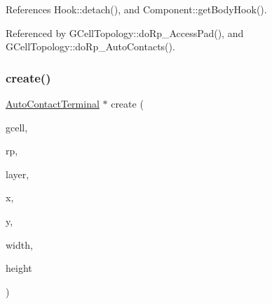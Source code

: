 References Hook\+::detach(), and Component\+::get\+Body\+Hook().



Referenced by G\+Cell\+Topology\+::do\+Rp\+\_\+\+Access\+Pad(), and G\+Cell\+Topology\+::do\+Rp\+\_\+\+Auto\+Contacts().

\mbox{\label{classKatabatic_1_1AutoContactTerminal_a60a625bca2cdfebcdcc7826ab781d1bb}} 
\subsubsection{\texorpdfstring{create()}{create()}\hspace{0.1cm}{\footnotesize\ttfamily [2/2]}}
{\footnotesize\ttfamily \mbox{\hyperlink{classKatabatic_1_1AutoContactTerminal}{Auto\+Contact\+Terminal}} $\ast$ create (\begin{DoxyParamCaption}\item[{\mbox{\hyperlink{classKatabatic_1_1GCell}{G\+Cell}} $\ast$}]{gcell,  }\item[{\textbf{ Component} $\ast$}]{rp,  }\item[{const \textbf{ Layer} $\ast$}]{layer,  }\item[{const \textbf{ Db\+U\+::\+Unit}}]{x,  }\item[{const \textbf{ Db\+U\+::\+Unit}}]{y,  }\item[{const \textbf{ Db\+U\+::\+Unit}}]{width,  }\item[{const \textbf{ Db\+U\+::\+Unit}}]{height }\end{DoxyParamCaption})\hspace{0.3cm}{\ttfamily [static]}}


